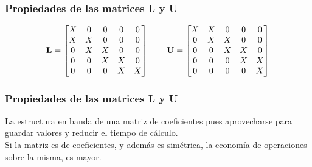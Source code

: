 \begin{frame}
\frametitle{Propiedades de las matrices \textbf{L} y \textbf{U}}
\begin{align*}
\mathbf{L} = \begin{bmatrix}
X & 0 & 0 & 0 & 0 \\
X & X & 0 & 0 & 0 \\
0 & X & X & 0 & 0 \\
0 & 0 & X & X & 0 \\
0 & 0 & 0 & X & X
\end{bmatrix} \hspace{0.75cm}
\mathbf{U} = \begin{bmatrix}
X & X & 0 & 0 & 0 \\
0 & X & X & 0 & 0 \\
0 & 0 & X & X & 0 \\
0 & 0 & 0 & X & X \\
0 & 0 & 0 & 0 & X
\end{bmatrix}
\end{align*}
\end{frame}
\begin{frame}
\frametitle{Propiedades de las matrices \textbf{L} y \textbf{U}}
La estructura en banda de una matriz de coeficientes pues aprovecharse para guardar valores y reducir el tiempo de cálculo. 
\\
\medskip
Si la matriz es de coeficientes, y además es simétrica, la economía de operaciones sobre la misma, es mayor.
\end{frame}
